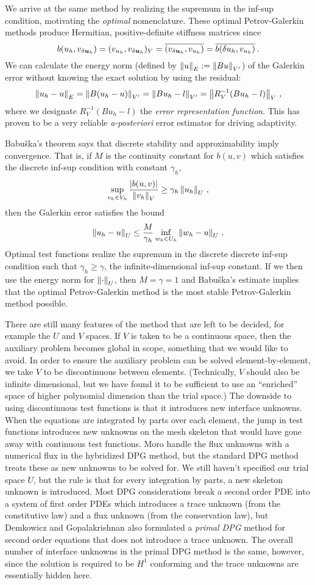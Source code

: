 \documentclass[Dissertation.tex]{subfiles}
\begin{document}
We arrive at the same method by realizing the supremum in the inf-sup condition, motivating the \emph{optimal} nomenclature.
These optimal Petrov-Galerkin methods produce Hermitian, positive-definite stiffness matrices since
\[
b(u_h,v_{\delta\boldsymbol{u}_h})=(v_{u_h},v_{\delta\boldsymbol{u}_h})_V=\overline{(v_{\delta\boldsymbol{u}_h},v_{u_h})}=\overline{b(\delta u_h,v_{u_h})}\,.
\]
We can calculate the energy norm (defined by $\left\| u \right\|_E:=\left\| Bu \right\|_{V'}$) of the Galerkin error without knowing the exact solution by using the residual:
\[
\left\| u_h-u \right\|_E=\left\| B(u_h-u) \right\|_{V'}=\left\| Bu_h-l \right\|_{V'}=\left\| R_V^{-1}(Bu_h-l) \right\|_V\,,
\]
where we designate $R_V^{-1}(Bu_h-l)$ the \emph{error representation function}.
This has proven to be a very reliable \emph{a-posteriori} error estimator for driving adaptivity.

Babu\v{s}ka's theorem\cite{Babuska70} says that discrete stability and approximability imply convergence.
That is, if $M$ is the continuity constant for $b(u,v)$ which satisfies the discrete inf-sup condition with constant $\gamma_h$,
\[
\sup_{v_h\in V_h}\frac{|b(u,v)|}{\left\| v_h \right\|_V}\geq\gamma_h\left\| u_h \right\|_U\,,
\]
then the Galerkin error satisfies the bound
\[
\left\| u_h-u \right\|_U\leq\frac{M}{\gamma_h}\inf_{w_h\in U_h}\left\| w_h-u \right\|_U\,.
\]
Optimal test functions realize the supremum in the discrete discrete inf-sup condition such that $\gamma_h\geq\gamma$,
the infinite-dimensional inf-sup constant.
If we then use the energy norm for $\left\| \cdot \right\|_U$, then $M=\gamma=1$ and Babu\v{s}ka's estimate implies that
the optimal Petrov-Galerkin method is the most stable Petrov-Galerkin method possible.

There are still many features of the method that are left to be decided, for example the $U$ and $V$ spaces.
If $V$ is taken to be a continuous space, then the auxiliary problem becomes global in scope, something that we would like to avoid.
In order to ensure the auxiliary problem can be solved element-by-element, we take $V$ to be discontinuous between elements.
(Technically, $V$ should also be infinite dimensional, but we have found it to be sufficient to use an ``enriched'' space of higher
polynomial dimension than the trial space.)
The downside to using discontinuous test functions is that it introduces new interface unknowns.
When the equations are integrated by parts over each element, the jump in test functions introduces new unknowns on the mesh skeleton
that would have gone away with continuous test functions.
Moro \etal\cite{MoroNguyenPeraire11} handle the flux unknowns with a numerical flux in the hybridized DPG method, but the standard DPG method treats
these as new unknowns to be solved for.
We still haven't specified our trial space $U$, but the rule is that for every integration by parts, a new skeleton unknown is introduced.
Most DPG considerations break a second order PDE into a system of first order PDEs which introduces a trace unknown (from the constitutive law)
and a flux unknown (from the conservation law), but Demkowicz and Gopalakrishnan also formulated a \emph{primal DPG} method for second order equations
that does not introduce a trace unknown.
The overall number of interface unknowns in the primal DPG method is the same, however, since the solution is required to be $H^1$ conforming
and the trace unknowns are essentially hidden here.
\end{document}
